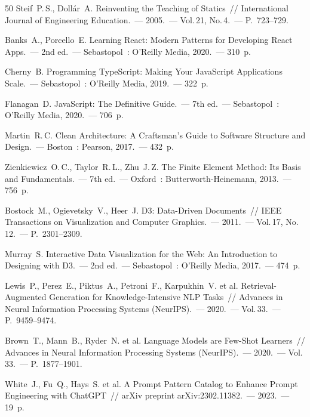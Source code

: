 \begin{thebibliography}{50}
Steif~P.\,S., Doll{\'a}r~A. Reinventing the Teaching of Statics~/\!/
International Journal of Engineering Education.~---
2005.~--- Vol.\,21, No.\,4.~--- P.~723--729.


Banks~A., Porcello~E. Learning React: Modern Patterns for Developing React Apps.~---
2nd ed.~--- Sebastopol~: O'Reilly Media, 2020.~--- 310~p.

Cherny~B. Programming TypeScript: Making Your JavaScript Applications Scale.~---
Sebastopol~: O'Reilly Media, 2019.~--- 322~p.

Flanagan~D. JavaScript: The Definitive Guide.~---
7th ed.~--- Sebastopol~: O'Reilly Media, 2020.~--- 706~p.


Martin~R.\,C. Clean Architecture: A Craftsman's Guide to Software Structure and Design.~---
Boston~: Pearson, 2017.~--- 432~p.


Zienkiewicz~O.\,C., Taylor~R.\,L., Zhu~J.\,Z.
The Finite Element Method: Its Basis and Fundamentals.~---
7th ed.~--- Oxford~: Butterworth-Heinemann, 2013.~--- 756~p.


Bostock~M., Ogievetsky~V., Heer~J.
D3: Data-Driven Documents~/\!/
IEEE Transactions on Visualization and Computer Graphics.~---
2011.~--- Vol.\,17, No.\,12.~--- P.~2301--2309.

Murray~S. Interactive Data Visualization for the Web: An Introduction to Designing with D3.~---
2nd ed.~--- Sebastopol~: O'Reilly Media, 2017.~--- 474~p.


Lewis~P., Perez~E., Piktus~A., Petroni~F., Karpukhin~V. et al.
Retrieval-Augmented Generation for Knowledge-Intensive NLP Tasks~/\!/
Advances in Neural Information Processing Systems (NeurIPS).~---
2020.~--- Vol.\,33.~--- P.~9459--9474.

Brown~T., Mann~B., Ryder~N. et al.
Language Models are Few-Shot Learners~/\!/
Advances in Neural Information Processing Systems (NeurIPS).~---
2020.~--- Vol.\,33.~--- P.~1877--1901.

White~J., Fu~Q., Hays~S. et al.
A Prompt Pattern Catalog to Enhance Prompt Engineering with ChatGPT~/\!/
arXiv preprint arXiv:2302.11382.~--- 2023.~--- 19~p.


\end{thebibliography}
